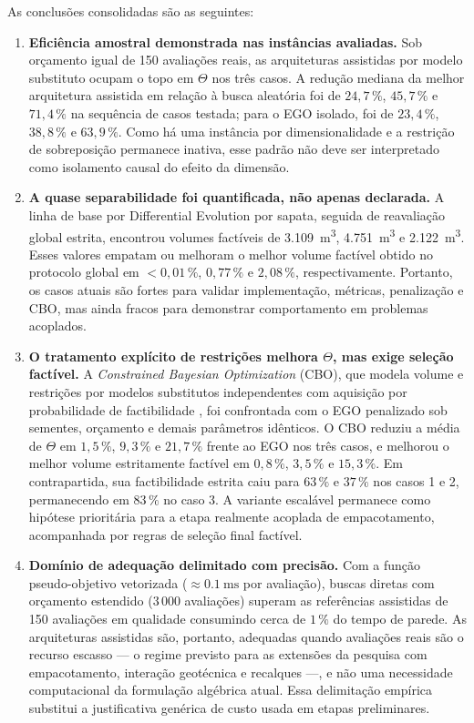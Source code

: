 As conclusões consolidadas são as seguintes:
\begin{enumerate}
    \item \textbf{Eficiência amostral demonstrada nas instâncias avaliadas.} Sob orçamento igual de 150 avaliações reais, as arquiteturas assistidas por modelo substituto ocupam o topo em $\Theta$ nos três casos. A redução mediana da melhor arquitetura assistida em relação à busca aleatória foi de $24{,}7\,\%$, $45{,}7\,\%$ e $71{,}4\,\%$ na sequência de casos testada; para o EGO isolado, foi de $23{,}4\,\%$, $38{,}8\,\%$ e $63{,}9\,\%$. Como há uma instância por dimensionalidade e a restrição de sobreposição permanece inativa, esse padrão não deve ser interpretado como isolamento causal do efeito da dimensão.
    \item \textbf{A quase separabilidade foi quantificada, não apenas declarada.} A linha de base por Differential Evolution por sapata, seguida de reavaliação global estrita, encontrou volumes factíveis de \SI{3,109}{\meter\cubed}, \SI{4,751}{\meter\cubed} e \SI{2,122}{\meter\cubed}. Esses valores empatam ou melhoram o melhor volume factível obtido no protocolo global em $<0{,}01\,\%$, $0{,}77\,\%$ e $2{,}08\,\%$, respectivamente. Portanto, os casos atuais são fortes para validar implementação, métricas, penalização e CBO, mas ainda fracos para demonstrar comportamento em problemas acoplados.
    \item \textbf{O tratamento explícito de restrições melhora $\Theta$, mas exige seleção factível.} A \textit{Constrained Bayesian Optimization} (CBO), que modela volume e restrições por modelos substitutos independentes com aquisição por probabilidade de factibilidade , foi confrontada com o EGO penalizado sob sementes, orçamento e demais parâmetros idênticos. O CBO reduziu a média de $\Theta$ em $1{,}5\,\%$, $9{,}3\,\%$ e $21{,}7\,\%$ frente ao EGO nos três casos, e melhorou o melhor volume estritamente factível em $0{,}8\,\%$, $3{,}5\,\%$ e $15{,}3\,\%$. Em contrapartida, sua factibilidade estrita caiu para $63\,\%$ e $37\,\%$ nos casos 1 e 2, permanecendo em $83\,\%$ no caso 3. A variante escalável  permanece como hipótese prioritária para a etapa realmente acoplada de empacotamento, acompanhada por regras de seleção final factível.
    \item \textbf{Domínio de adequação delimitado com precisão.} Com a função pseudo-objetivo vetorizada ($\approx \SI{0,1}{\milli\second}$ por avaliação), buscas diretas com orçamento estendido ($3\,000$ avaliações) superam as referências assistidas de 150 avaliações em qualidade consumindo cerca de $1\,\%$ do tempo de parede. As arquiteturas assistidas são, portanto, adequadas quando avaliações reais são o recurso escasso — o regime previsto para as extensões da pesquisa com empacotamento, interação geotécnica e recalques —, e não uma necessidade computacional da formulação algébrica atual. Essa delimitação empírica substitui a justificativa genérica de custo usada em etapas preliminares.

\end{enumerate}
